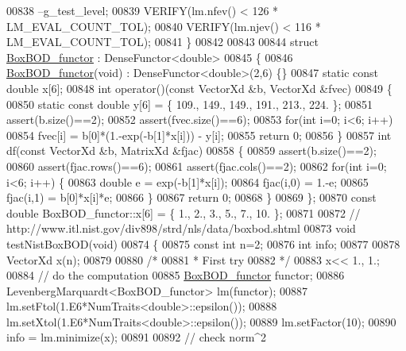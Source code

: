 \begin{DoxyCode}
00838   --g\_test\_level;
00839   VERIFY(lm.nfev() < 126 * LM\_EVAL\_COUNT\_TOL);
00840   VERIFY(lm.njev() < 116 * LM\_EVAL\_COUNT\_TOL);
00841 \}
00842 
00843 
00844 \textcolor{keyword}{struct }\hyperlink{struct_box_b_o_d__functor}{BoxBOD\_functor} : DenseFunctor<double>
00845 \{
00846     \hyperlink{struct_box_b_o_d__functor}{BoxBOD\_functor}(\textcolor{keywordtype}{void}) : DenseFunctor<double>(2,6) \{\}
00847     \textcolor{keyword}{static} \textcolor{keyword}{const} \textcolor{keywordtype}{double} x[6];
00848     \textcolor{keywordtype}{int} operator()(\textcolor{keyword}{const} VectorXd &b, VectorXd &fvec)
00849     \{
00850         \textcolor{keyword}{static} \textcolor{keyword}{const} \textcolor{keywordtype}{double} y[6] = \{ 109., 149., 149., 191., 213., 224. \};
00851         assert(b.size()==2);
00852         assert(fvec.size()==6);
00853         \textcolor{keywordflow}{for}(\textcolor{keywordtype}{int} i=0; i<6; i++)
00854             fvec[i] =  b[0]*(1.-exp(-b[1]*x[i])) - y[i];
00855         \textcolor{keywordflow}{return} 0;
00856     \}
00857     \textcolor{keywordtype}{int} df(\textcolor{keyword}{const} VectorXd &b, MatrixXd &fjac)
00858     \{
00859         assert(b.size()==2);
00860         assert(fjac.rows()==6);
00861         assert(fjac.cols()==2);
00862         \textcolor{keywordflow}{for}(\textcolor{keywordtype}{int} i=0; i<6; i++) \{
00863             \textcolor{keywordtype}{double} e = exp(-b[1]*x[i]);
00864             fjac(i,0) = 1.-e;
00865             fjac(i,1) = b[0]*x[i]*e;
00866         \}
00867         \textcolor{keywordflow}{return} 0;
00868     \}
00869 \};
00870 \textcolor{keyword}{const} \textcolor{keywordtype}{double} BoxBOD\_functor::x[6] = \{ 1., 2., 3., 5., 7., 10. \};
00871 
00872 \textcolor{comment}{// http://www.itl.nist.gov/div898/strd/nls/data/boxbod.shtml}
00873 \textcolor{keywordtype}{void} testNistBoxBOD(\textcolor{keywordtype}{void})
00874 \{
00875   \textcolor{keyword}{const} \textcolor{keywordtype}{int} n=2;
00876   \textcolor{keywordtype}{int} info;
00877 
00878   VectorXd x(n);
00879 
00880   \textcolor{comment}{/*}
00881 \textcolor{comment}{   * First try}
00882 \textcolor{comment}{   */}
00883   x<< 1., 1.;
00884   \textcolor{comment}{// do the computation}
00885   \hyperlink{struct_box_b_o_d__functor}{BoxBOD\_functor} functor;
00886   LevenbergMarquardt<BoxBOD\_functor> lm(functor);
00887   lm.setFtol(1.E6*NumTraits<double>::epsilon());
00888   lm.setXtol(1.E6*NumTraits<double>::epsilon());
00889   lm.setFactor(10);
00890   info = lm.minimize(x);
00891 
00892   \textcolor{comment}{// check norm^2}

\end{DoxyCode}

